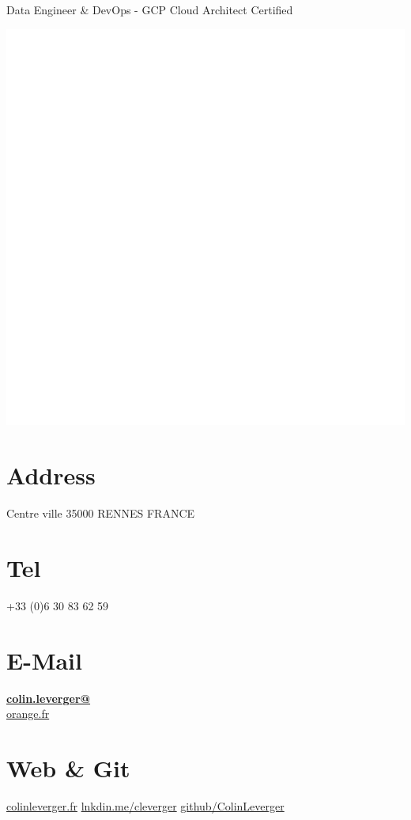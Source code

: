 \documentclass[]{friggeri-cv}
\begin{document}
      {Data Engineer \& DevOps - GCP Cloud Architect Certified}


\begin{aside}
  \includegraphics[scale=0.01]{img/white.png}
  \section{Address}
  Centre ville
  35000 RENNES 
  FRANCE
  ~
  \section{Tel}
    +33 (0)6 30 83 62 59 
    ~
  \section{E-Mail}
    \href{mailto:colin.leverger@orange.fr}{\textbf{colin.leverger@}\\orange.fr}
  \section{Web \& Git}
    \href{http://www.colinleverger.fr}{colinleverger.fr}
    \href{https://www.linkedin.com/in/colinleverger}{lnkdin.me/cleverger}
    \href{https://github.com/ColinLeverger}{github/ColinLeverger}
    ~

\end{aside}
\end{document}
